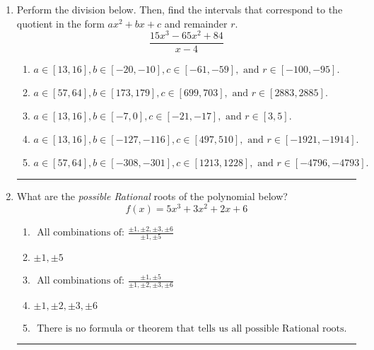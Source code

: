 \documentclass[14pt]{extbook}
\newcommand{\litem}[1]{\item#1\hspace*{-1cm}\rule{\textwidth}{0.4pt}}
\begin{document}
\begin{enumerate}
{\begin{enumerate}[label=\Alph*.]
\end{enumerate} }
\litem{
Perform the division below. Then, find the intervals that correspond to the quotient in the form $ax^2+bx+c$ and remainder $r$.\[ \frac{15x^{3} -65 x^{2} + 84}{x -4} \]\begin{enumerate}[label=\Alph*.]
\item \( a \in [13, 16], b \in [-20, -10], c \in [-61, -59], \text{ and } r \in [-100, -95]. \)
\item \( a \in [57, 64], b \in [173, 179], c \in [699, 703], \text{ and } r \in [2883, 2885]. \)
\item \( a \in [13, 16], b \in [-7, 0], c \in [-21, -17], \text{ and } r \in [3, 5]. \)
\item \( a \in [13, 16], b \in [-127, -116], c \in [497, 510], \text{ and } r \in [-1921, -1914]. \)
\item \( a \in [57, 64], b \in [-308, -301], c \in [1213, 1228], \text{ and } r \in [-4796, -4793]. \)

\end{enumerate} }
\litem{
What are the \textit{possible Rational} roots of the polynomial below?\[ f(x) = 5x^{3} +3 x^{2} +2 x + 6 \]\begin{enumerate}[label=\Alph*.]
\item \( \text{ All combinations of: }\frac{\pm 1,\pm 2,\pm 3,\pm 6}{\pm 1,\pm 5} \)
\item \( \pm 1,\pm 5 \)
\item \( \text{ All combinations of: }\frac{\pm 1,\pm 5}{\pm 1,\pm 2,\pm 3,\pm 6} \)
\item \( \pm 1,\pm 2,\pm 3,\pm 6 \)
\item \( \text{ There is no formula or theorem that tells us all possible Rational roots.} \)

\end{enumerate} }
\end{enumerate}
\end{document}
